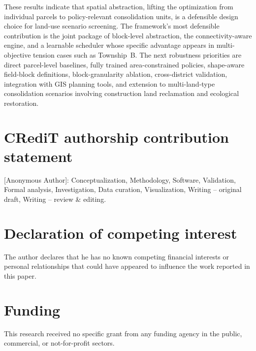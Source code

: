 \documentclass[preprint,12pt]{elsarticle}
\begin{document}
These results indicate that spatial abstraction, lifting the optimization from individual parcels to policy-relevant consolidation units, is a defensible design choice for land-use scenario screening. The framework's most defensible contribution is the joint package of block-level abstraction, the connectivity-aware engine, and a learnable scheduler whose specific advantage appears in multi-objective tension cases such as Township~B. The next robustness priorities are direct parcel-level baselines, fully trained area-constrained policies, shape-aware field-block definitions, block-granularity ablation, cross-district validation, integration with GIS planning tools, and extension to multi-land-type consolidation scenarios involving construction land reclamation and ecological restoration.



\section*{CRediT authorship contribution statement}
[Anonymous Author]: Conceptualization, Methodology, Software, Validation, Formal analysis, Investigation, Data curation, Visualization, Writing -- original draft, Writing -- review \& editing.

\section*{Declaration of competing interest}
The author declares that he has no known competing financial interests or personal relationships that could have appeared to influence the work reported in this paper.

\section*{Funding}
This research received no specific grant from any funding agency in the public, commercial, or not-for-profit sectors.
\end{document}

